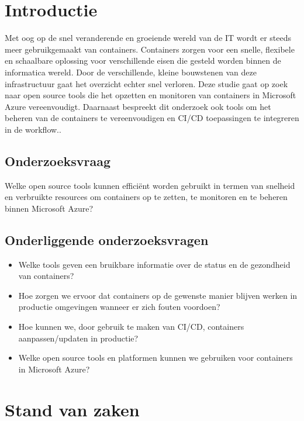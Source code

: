 
\section{Introductie} %
\label{sec:introductie}
Met oog op de snel veranderende en groeiende wereld van de IT wordt er steeds meer gebruikgemaakt van containers. Containers zorgen voor een snelle, flexibele en schaalbare oplossing voor verschillende  eisen die gesteld worden binnen de informatica wereld. Door de verschillende, kleine bouwstenen van deze infrastructuur gaat het overzicht echter snel verloren. Deze studie gaat op zoek naar open source tools die het opzetten en monitoren van containers in Microsoft Azure vereenvoudigt. Daarnaast bespreekt dit onderzoek ook tools om het beheren van de containers te vereenvoudigen en CI/CD toepassingen te integreren in de workflow..
\subsection{Onderzoeksvraag}
Welke open source tools kunnen efficiënt worden gebruikt in termen van snelheid en verbruikte resources  om containers op te zetten, te monitoren en te beheren binnen Microsoft Azure?
\subsection{Onderliggende onderzoeksvragen}
\begin{itemize}
    \item Welke tools geven een bruikbare informatie over de status en de gezondheid van containers?
    \item Hoe zorgen we ervoor dat containers op de gewenste manier blijven werken in productie omgevingen wanneer er zich fouten voordoen?
    \item Hoe kunnen we, door gebruik te maken van CI/CD, containers aanpassen/updaten in productie?
    \item Welke open source tools en platformen kunnen we gebruiken voor containers in Microsoft Azure?
\end{itemize}

\section{Stand van zaken}
\label{sec:state-of-the-art}

